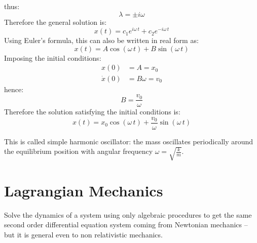 \documentclass[12pt,a4paper]{article}
\begin{document}
thus:
\begin{equation*}
	\lambda = \pm i\omega
\end{equation*}
Therefore the general solution is:
\begin{equation*}
	x(t) = c_1 e^{i\omega\,t} + c_2 e^{-i\omega\,t}
\end{equation*}
Using Euler's formula, this can also be written in real form as:
\begin{equation*}
	x(t) = A\cos\left(\omega\,t\right) + B\sin\left(\omega\,t\right)
\end{equation*}
Imposing the initial conditions:
\begin{align*}
	x(0) &= A = x_0\\
	\dot{x}(0) &= B\omega = v_0
\end{align*}
hence:
\begin{equation*}
	B = \frac{v_0}{\omega}
\end{equation*}
Therefore the solution satisfying the initial conditions is:
\begin{equation*}
	x(t) = x_0\cos\left(\omega\,t\right)
	+ \frac{v_0}{\omega}\sin\left(\omega\,t\right)
\end{equation*}

This is called simple harmonic oscillator: the mass oscillates
periodically around the equilibrium position with angular frequency $\omega = \sqrt{\frac{k}{m}}$.

\section{Lagrangian Mechanics}
Solve the dynamics of a system using only algebraic procedures to get the same second order differential equation system coming from Newtonian mechanics -- but it is general even to non relativistic mechanics.
\end{document}
